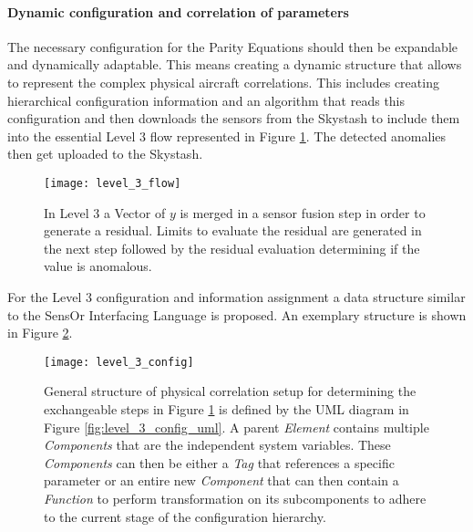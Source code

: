 \paragraph{Dynamic configuration and correlation of parameters}

The necessary configuration for the Parity Equations should then be expandable and dynamically adaptable. This means creating a dynamic structure that allows to represent the complex physical aircraft correlations. This includes creating hierarchical configuration information and an algorithm that reads this configuration and then downloads the sensors from the Skystash to include them into the essential Level 3 flow represented in Figure \ref{fig:level_3_flow}. The detected anomalies then get uploaded to the Skystash.

\begin{figure}
    \centering
    \texttt{[image: level\_3\_flow]}
    \caption[Level 3 flowchart for residual evaluation]{In Level 3 a Vector of $y$ is merged in a sensor fusion step in order to generate a residual. Limits to evaluate the residual are generated in the next step followed by the residual evaluation determining if the value is anomalous.}
    \label{fig:level_3_flow}
\end{figure}

For the Level 3 configuration and information assignment a data structure similar to the SensOr Interfacing Language is proposed. An exemplary structure is shown in Figure \ref{fig:level_3_config}.
\begin{figure}
    \centering
    \texttt{[image: level\_3\_config]}
    \caption[Level 3 hierarchical Configuration Structure]{General structure of physical correlation setup for determining the exchangeable steps in Figure \ref{fig:level_3_flow} is defined by the UML diagram in Figure \ref{fig:level_3_config_uml}. A parent \textit{Element} contains multiple \textit{Components} that are the independent system variables. These \textit{Components} can then be either a \textit{Tag} that references a specific parameter or an entire new \textit{Component} that can then contain a \textit{Function} to perform transformation on its subcomponents to adhere to the current stage of the configuration hierarchy.}
    \label{fig:level_3_config}
\end{figure}

